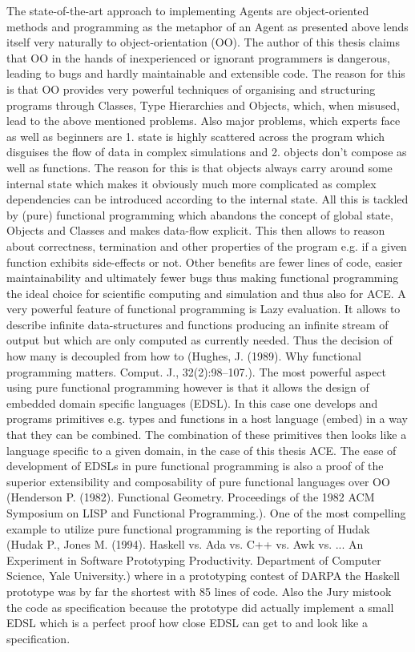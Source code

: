 The state-of-the-art approach to implementing Agents are object-oriented methods and programming as the metaphor of an Agent as presented above lends itself very naturally to object-orientation (OO). The author of this thesis claims that OO in the hands of inexperienced or ignorant programmers is dangerous, leading to bugs and hardly maintainable and extensible code. The reason for this is that OO provides very powerful techniques of organising and structuring programs through Classes, Type Hierarchies and Objects, which, when misused, lead to the above mentioned problems. Also major problems, which experts face as well as beginners are 1. state is highly scattered across the program which disguises the flow of data in complex simulations and 2. objects don’t compose as well as functions. The reason for this is that objects always carry around some internal state which makes it obviously much more complicated as complex dependencies can be introduced according to the internal state.
All this is tackled by (pure) functional programming which abandons the concept of global state, Objects and Classes and makes data-flow explicit. This then allows to reason about correctness, termination and other properties of the program e.g. if a given function exhibits side-effects or not. Other benefits are fewer lines of code, easier maintainability and ultimately fewer bugs thus making functional programming the ideal choice for scientific computing and simulation and thus also for ACE. A very powerful feature of functional programming is Lazy evaluation. It allows to describe infinite data-structures and functions producing an infinite stream of output but which are only computed as currently needed. Thus the decision of how many is decoupled from how to (Hughes, J. (1989). Why functional programming matters. Comput. J., 32(2):98–107.).
The most powerful aspect using pure functional programming however is that it allows the design of embedded domain specific languages (EDSL). In this case one develops and programs primitives e.g. types and functions in a host language (embed) in a way that they can be combined. The combination of these primitives then looks like a language specific to a given domain, in the case of this thesis ACE. The ease of development of EDSLs in pure functional programming is also a proof of the superior extensibility and composability of pure functional languages over OO (Henderson P. (1982). Functional Geometry. Proceedings of the 1982 ACM Symposium on LISP and Functional Programming.).
One of the most compelling example to utilize pure functional programming is the reporting of Hudak (Hudak P., Jones M. (1994). Haskell vs. Ada vs. C++ vs. Awk vs. ... An Experiment in Software Prototyping Productivity. Department of Computer Science, Yale University.)  where in a prototyping contest of DARPA the Haskell prototype was by far the shortest with 85 lines of code. Also the Jury mistook the code as specification because the prototype did actually implement a small EDSL which is a perfect proof how close EDSL can get to and look like a specification.


